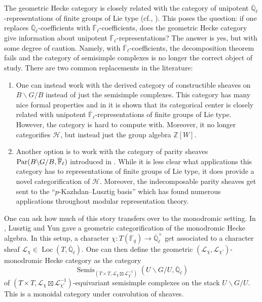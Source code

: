 \documentclass{amsart}
\newcommand{\Q}{\mathbb{Q}}
\newcommand{\Z}{\mathbb{Z}}
\newcommand{\F}{\mathbb{F}}
\newcommand{\scrH}{\mathcal{H}}
\newcommand{\scrL}{\mathcal{L}}
\DeclareMathOperator{\Semis}{Semis}
\DeclareMathOperator{\Loc}{Loc}
\newcommand{\BGB}{B \backslash G/B}
\newcommand{\UGU}{U \backslash G/U}
\theoremstyle{definition}
\numberwithin{equation}{subsection}
\begin{document}
The geometric Hecke category is closely related with the category of unipotent $\overline{\Q}_\ell$-representations of finite groups of Lie type (cf., \cite{BZN, BFO, Lus05}).
This poses the question: if one replaces $\overline{\Q}_\ell$-coefficients with $\overline{\F}_{\ell}$-coefficients, does the geometric Hecke category give information about unipotent $\overline{\F}_\ell$-representations?
The answer is yes, but with some degree of caution.
Namely, with $\overline{\F}_{\ell}$-coefficients, the decomposition theorem fails and the category of semisimple complexes is no longer the correct object of study.
There are two common replacements in the literature:
\begin{enumerate}
    \item One can instead work with the derived category of constructible sheaves on $\BGB$ instead of just the semisimple complexes.
    This category has many nice formal properties and in \cite{Zhu} it is shown that its categorical center is closely related with unipotent $\overline{\F}_\ell$-representations of finite groups of Lie type.
    However, the category is hard to compute with. Moreover, it no longer categorifies $\scrH$, but instead just the group algebra $\Z [W]$.
    \item Another option is to work with the category of parity sheaves $\textnormal{Par} (\BGB, \overline{\F}_{\ell})$ introduced in \cite{JMW}.
        While it is less clear what applications this category has to representations of finite groups of Lie type, it does provide a novel categorification of $\scrH$.
        Moreover, the indecomposable parity sheaves get sent to the ``$p$-Kazhdan--Lusztig basis'' which has found numerous applications throughout modular representation theory.
\end{enumerate}

One can ask how much of this story transfers over to the monodromic setting.
In \cite{LY}, Lusztig and Yun gave a geometric categorification of the monodromic Hecke algebra.
In this setup, a character $\chi : T (\F_q) \to \overline{\Q}_\ell^{\times}$ get associated to a character sheaf $\scrL_{\chi} \in \Loc (T, \overline{\Q}_\ell)$.
One can then define the geometric $(\scrL_{\chi}, \scrL_{\chi'})$-monodromic Hecke category as the category 
\[ \Semis_{(T \times T, \scrL_{\chi} \boxtimes \scrL_{\chi'}^{-1}) } (\UGU, \overline{\Q}_\ell)\] 
of $(T \times T,\scrL_{\chi} \boxtimes \scrL_{\chi'}^{-1}) $-equivariant semisimple  complexes on the stack $\UGU$.
This is a monoidal category under convolution of sheaves.
\end{document}
